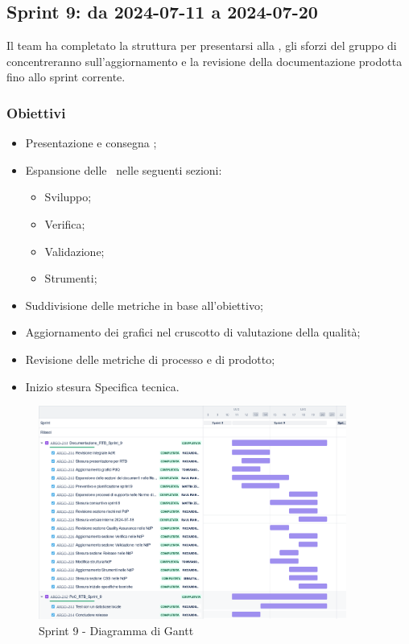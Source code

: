 \subsection{Sprint 9: da 2024-07-11 a 2024-07-20}
\par Il team ha completato la struttura per presentarsi alla , gli sforzi del gruppo di concentreranno sull’aggiornamento e la revisione della documentazione prodotta fino allo sprint corrente.

\subsubsection{Obiettivi}
\begin{itemize}
  \item Presentazione e consegna ;
  \item Espansione delle \NdP\ nelle seguenti sezioni:
  \begin{itemize}
    \item Sviluppo;
    \item Verifica;
    \item Validazione;
    \item Strumenti;
  \end{itemize}
  \item Suddivisione delle metriche in base all’obiettivo;
  \item Aggiornamento dei grafici nel cruscotto di valutazione della qualità;
  \item Revisione delle metriche di processo e di prodotto;
  \item Inizio stesura Specifica tecnica.
\end{itemize}

\begin{figure}[H]
  \centering
  \includegraphics[width=0.90\textwidth]{assets/Pianificazione/Sprint-9/gantt.png}
  \caption{Sprint 9 - Diagramma di Gantt}\label{fig:sprint-9-gantt}
\end{figure}

